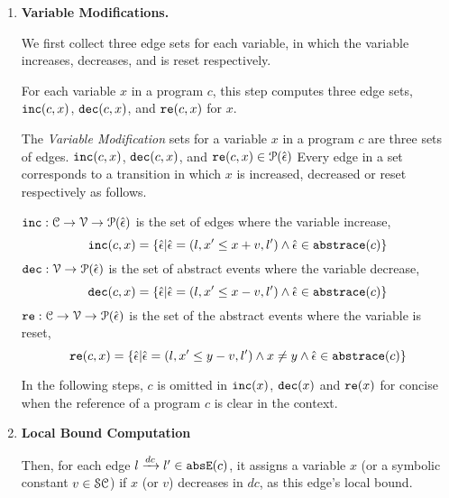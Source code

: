 \begin{enumerate}
    
\item \textbf{Variable Modifications.}

We first collect three edge sets for each variable,
in which the variable increases, decreases, and is reset respectively.

For each variable $x$ in a program $c$, this step computes three edge sets, $\mathtt{inc}(c, x)$, $\mathtt{dec}(c, x)$,
 and $\mathtt{re}(c, x)$ for $x$.
 \begin{defn}
 \label{def:var_modification}
 The \emph{Variable Modification} sets for a variable $x$ in a program $c$ are three sets of edges.
 $\mathtt{inc}(c, x)$, $\mathtt{dec}(c, x)$,
 and $\mathtt{re}(c, x) \in \mathcal{P}(\hat{\mathtt{\epsilon}{}})$
 Every edge in a set corresponds to a transition in which $x$ is increased,
 decreased
 or reset
 respectively as follows.
 
 $\mathtt{inc}: \mathcal{C} \to \mathcal{V} \to \mathcal{P}(\hat{\mathtt{\epsilon}{}}) $
 is the set of edges where the variable increase, 
 \[ \inc(c, x) = \left\{ \absevent | \absevent = (l, x' \leq x + v, l') \land \absevent \in \absflow(c) \right\} \]
 $\mathtt{dec}: \mathcal{V} \to \mathcal{P}(\hat{\mathtt{\epsilon}{}}) $
 is the set of abstract events where the variable decrease,
 \[\dec(c, x) = \left\{\absevent| \absevent = (l, x' \leq x - v, l') \land \absevent \in \absflow(c) \right\}\]
 $\mathtt{re}: \mathcal{C} \to \mathcal{V} \to \mathcal{P}(\hat{\mathtt{\epsilon}{}}) $ is the set of the abstract events where the variable is reset,
%
 \[\reset(c, x) = \left\{ \absevent| \absevent = (l, x' \leq y - v, l') \land x \neq y \land \absevent \in \absflow(c) \right\}\]
 \end{defn}
 In the following steps, $c$ is omitted in $\mathtt{inc}(x)$,
$\mathtt{dec}(x)$ and $\mathtt{re}(x)$ for concise when the reference of a program $c$ is clear in the context.

\item \textbf{Local Bound Computation}

Then, for each edge $l \xrightarrow{dc} l' \in \mathtt{abs}{\mathtt{E}}(c)$, it assigns a variable $x$ (or a symbolic constant $v \in \mathcal{SC}$) if $x$ (or $v$) decreases in $dc$, as this edge's local bound.


\end{enumerate}
